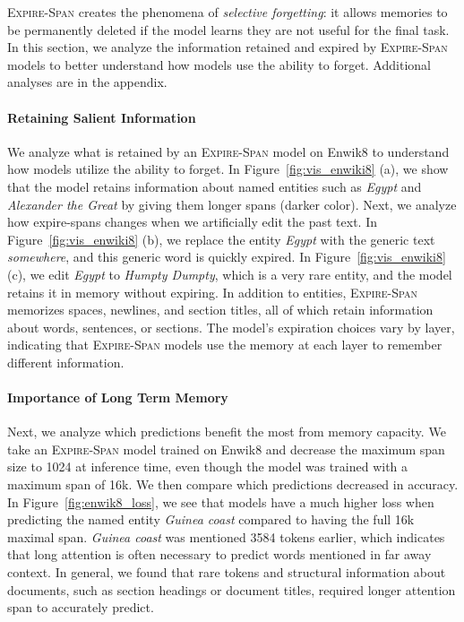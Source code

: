 \textsc{Expire-Span} creates the phenomena of \textit{selective forgetting}: it allows memories to be permanently deleted if the model learns they are not useful for the final task. In this section, we analyze the information retained and expired by \textsc{Expire-Span} models to better understand how models use the ability to forget. Additional analyses are in the appendix.

\paragraph{Retaining Salient Information}

We analyze what is retained by an \textsc{Expire-Span} model on Enwik8 to understand how models utilize the ability to forget. In Figure~\ref{fig:vis_enwiki8} (a), we show that the model retains information about named entities such as \textit{Egypt} and \textit{Alexander the Great} by giving them longer spans (darker color). Next, we analyze how expire-spans changes when we artificially edit the past text. In Figure~\ref{fig:vis_enwiki8} (b), we replace the entity \textit{Egypt} with the generic text \textit{somewhere}, and this generic word is quickly expired. In Figure~\ref{fig:vis_enwiki8} (c), we edit \textit{Egypt} to \textit{Humpty Dumpty}, which is a very rare entity, and the model retains it in memory without expiring.
In addition to entities, \textsc{Expire-Span} memorizes spaces, newlines, and section titles, all of which retain information about words, sentences, or sections. The model's expiration choices vary by layer, indicating that \textsc{Expire-Span} models use the memory at each layer to remember different information. 


\paragraph{Importance of Long Term Memory}
Next, we analyze which predictions benefit the most from memory capacity. We take an \textsc{Expire-Span} model trained on Enwik8 and decrease the maximum span size to 1024 at inference time, even though the model was trained with a maximum span of 16k. We then compare which predictions decreased in accuracy. In Figure~\ref{fig:enwik8_loss}, we see that  models have a much higher loss when predicting the named entity \textit{Guinea coast} compared to having the full 16k maximal span. \textit{Guinea coast} was mentioned 3584 tokens earlier, which indicates that long attention is often necessary to predict words mentioned in far away context. In general, we found that rare tokens and structural information about documents, such as section headings or document titles, required longer attention span to accurately predict.

